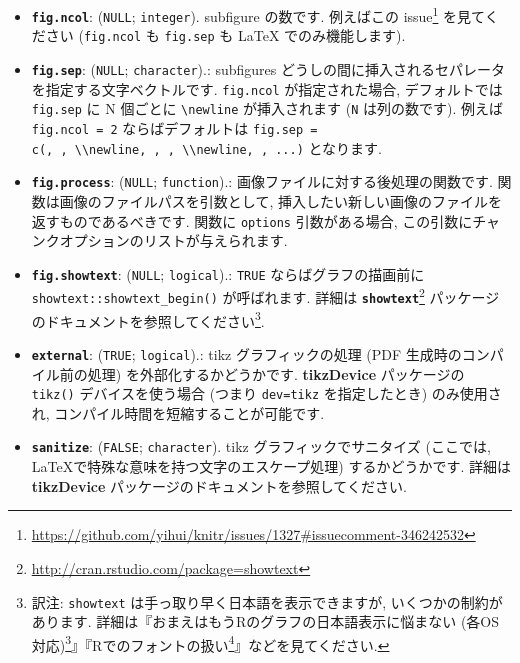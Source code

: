 \documentclass[
  11pt,
  lualatex,
  ja=standard]{bxjsreport}
\renewcommand{\href}[2]{#2\footnote{\url{#1}}}
\begin{document}
\begin{itemize}
  \textbf{\texttt{fig.subcap}}: (\texttt{NULL}).: subfigures のためのキャプションです. 複数のグラフが1つのチャンクにあり, かつ \texttt{fig.subcap} も \texttt{fig.cap} is \texttt{NULL} である場合, \texttt{\textbackslash{}subfloat\{\}} が個別の画像の表示に使われます (この場合はプリアンブルに \texttt{\textbackslash{}usepackage\{subfig\}} と書く必要があります). 具体例は \href{https://github.com/yihui/knitr-examples/blob/master/067-graphics-options.Rnw}{067-graphics-options.Rnw} を参照してください.
\item
  \textbf{\texttt{fig.ncol}}: (\texttt{NULL}; \texttt{integer}). subfigure の数です. 例えば\href{https://github.com/yihui/knitr/issues/1327\#issuecomment-346242532}{この issue} を見てください (\texttt{fig.ncol} も \texttt{fig.sep} も LaTeX でのみ機能します).
\item
  \textbf{\texttt{fig.sep}}: (\texttt{NULL}; \texttt{character}).: subfigures どうしの間に挿入されるセパレータを指定する文字ベクトルです. \texttt{fig.ncol} が指定された場合, デフォルトでは \texttt{fig.sep} に N 個ごとに \texttt{\textbackslash{}newline} が挿入されます (\texttt{N} は列の数です). 例えば \texttt{fig.ncol = 2} ならばデフォルトは \texttt{fig.sep = c(\textquotesingle{}\textquotesingle{},\ \textquotesingle{}\textquotesingle{},\ \textquotesingle{}\textbackslash{}\textbackslash{}newline\textquotesingle{},\ \textquotesingle{}\textquotesingle{},\ \textquotesingle{}\textquotesingle{},\ \textquotesingle{}\textbackslash{}\textbackslash{}newline\textquotesingle{},\ \textquotesingle{}\textquotesingle{},\ ...)} となります.
\item
  \textbf{\texttt{fig.process}}: (\texttt{NULL}; \texttt{function}).: 画像ファイルに対する後処理の関数です. 関数は画像のファイルパスを引数として, 挿入したい新しい画像のファイルを返すものであるべきです. 関数に \texttt{options} 引数がある場合, この引数にチャンクオプションのリストが与えられます.
\item
  \textbf{\texttt{fig.showtext}}: (\texttt{NULL}; \texttt{logical}).: \texttt{TRUE} ならばグラフの描画前に \texttt{showtext::showtext\_begin()} が呼ばれます. 詳細は \href{http://cran.rstudio.com/package=showtext}{\textbf{\texttt{showtext}}} パッケージのドキュメントを参照してください\footnote{訳注: \texttt{showtext} は手っ取り早く日本語を表示できますが, いくつかの制約があります. 詳細は『\href{https://ill-identified.hatenablog.com/entry/2020/10/03/200618}{おまえはもうRのグラフの日本語表示に悩まない (各OS対応)}』『\href{https://oku.edu.mie-u.ac.jp/~okumura/stat/font.html}{Rでのフォントの扱い}』などを見てください.}.
\item
  \textbf{\texttt{external}}: (\texttt{TRUE}; \texttt{logical}).: tikz グラフィックの処理 (PDF 生成時のコンパイル前の処理) を外部化するかどうかです. \textbf{tikzDevice} パッケージの \texttt{tikz()} デバイスを使う場合 (つまり \texttt{dev=\textquotesingle{}tikz\textquotesingle{}} を指定したとき) のみ使用され, コンパイル時間を短縮することが可能です.
\item
  \textbf{\texttt{sanitize}}: (\texttt{FALSE}; \texttt{character}). tikz グラフィックでサニタイズ (ここでは, LaTeXで特殊な意味を持つ文字のエスケープ処理) するかどうかです. 詳細は \textbf{tikzDevice} パッケージのドキュメントを参照してください.
\end{itemize}
\end{document}
